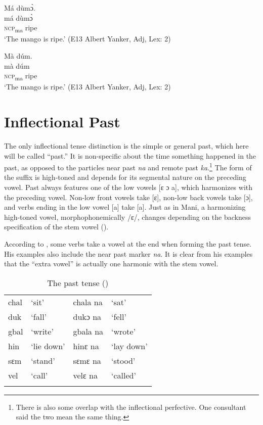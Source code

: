     \ex \label{ex:117b}  Má dùmɔ̀.\\
    \gll má    dùmɔ̀\\
    \textsc{ncp}\textsubscript{ma}    ripe\\
     \glt ‘The mango is ripe.' (E13 Albert Yanker, Adj, Lex: 2)

    \ex \label{ex:117c} Mà dúm.\\
    \gll mà    dúm\\
    \textsc{ncp}\textsubscript{ma}      ripe\\
     \glt ‘The mango is ripe.' (E13 Albert Yanker, Adj, Lex: 2)
    \z
    \z

\section{Inflectional Past}
\label{sec:4.2}\hypertarget{Toc115517783}{}
The only inflectional tense distinction is the simple or general past, which here will be called “past.” It is non-specific about the time something happened in the past, as opposed to the particles near past \textit{na} and remote past \textit{ka}.\footnote{There is also some overlap with the inflectional perfective. One consultant said the two mean the same thing.} The form of the suffix is high-toned and depends for its segmental nature on the preceding vowel. Past always features one of the low vowels [ɛ ɔ a], which harmonizes with the preceding vowel. Non-low front vowels take [ɛ], non-low back vowels take [ɔ], and verbs ending in the low vowel [a] take [a]. Just as in Mani, a harmonizing high-toned vowel, morphophonemically /ɛ/, changes depending on the backness specification of the stem vowel (\citealt{Childs2011}).

According to \citet[48]{Sumner1921}, some verbs take a vowel at the end when forming the past tense. His examples also include the near past marker \textit{na}. It is clear from his examples that the “extra vowel” is actually one harmonic with the stem vowel.

\begin{table}
\caption{\label{tab:verbmorph:28}The past tense ({\citealt{Sumner1921}})}



\begin{tabular}{llll}
\lsptoprule
chal & ‘sit' & chala na & ‘sat'\\
duk & ‘fall' & dukɔ na & ‘fell'\\
gbal & ‘write' & gbala na & ‘wrote'\\
hin & ‘lie down' & hinɛ na & ‘lay down'\\
sɛm & ‘stand' & sɛmɛ na & ‘stood'\\
vel & ‘call' & velɛ na & ‘called'\\
\lspbottomrule
\end{tabular}
\end{table}

